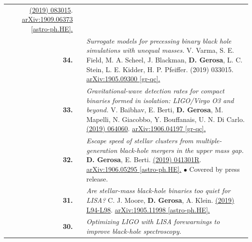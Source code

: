{\begin{longtable}{rp{0.3cm}p{15.8cm}}
\newline{}
\href{https://journals.aps.org/prd/abstract/10.1103/PhysRevD.100.083015}{\prd 100 (2019) 083015}. \href{https://arxiv.org/abs/1909.06373}{arXiv:1909.06373 [astro-ph.HE].}
\vspace{0.09cm}\\
%
\textbf{34.} & & \textit{Surrogate models for precessing binary black hole simulations with unequal masses.}
\newline{}
V. Varma, S. E. Field, M. A. Scheel, J. Blackman, \textbf{D. Gerosa}, L. C. Stein, L. E. Kidder, H. P. Pfeiffer.
\newline{}
{\prr 1 (2019) 033015}. \href{https://arxiv.org/abs/1905.09300}{arXiv:1905.09300 [gr-qc].}
\vspace{0.09cm}\\
%
\textbf{33.} & & \textit{Gravitational-wave detection rates for compact binaries formed in isolation: LIGO/Virgo O3 and beyond.}
\newline{}
V. Baibhav, E. Berti, \textbf{D. Gerosa}, M. Mapelli, N. Giacobbo, Y. Bouffanais, U. N. Di Carlo.
\newline{}
\href{https://journals.aps.org/prd/abstract/10.1103/PhysRevD.100.064060}{\prd 100 (2019) 064060}. \href{https://arxiv.org/abs/1906.04197}{arXiv:1906.04197 [gr-qc].}
\vspace{0.09cm}\\
%
\textbf{32.} & & \textit{Escape speed of stellar clusters from multiple-generation black-hole mergers in the upper mass gap.}
\newline{}
\textbf{D. Gerosa}, E. Berti.
\newline{}
\href{https://journals.aps.org/prd/abstract/10.1103/PhysRevD.100.041301}{\prdrc 100 (2019) 041301R}. \href{https://arxiv.org/abs/1906.05295}{arXiv:1906.05295 [astro-ph.HE].}
\newline{}
\textcolor{color1}{$\bullet$} Covered by press release.
\vspace{0.09cm}\\
%
\textbf{31.} & & \textit{Are stellar-mass black-hole binaries too quiet for LISA?}
\newline{}
C. J. Moore, \textbf{D. Gerosa}, A. Klein.
\newline{}
\href{https://doi.org/10.1093/mnrasl/slz104}{\mnrasl 488 (2019) L94-L98}. \href{https://arxiv.org/abs/1905.11998}{arXiv:1905.11998 [astro-ph.HE].}
\vspace{0.09cm}\\
%
\textbf{30.} & & \textit{Optimizing LIGO with LISA forewarnings to improve black-hole spectroscopy.}

\end{longtable}}
